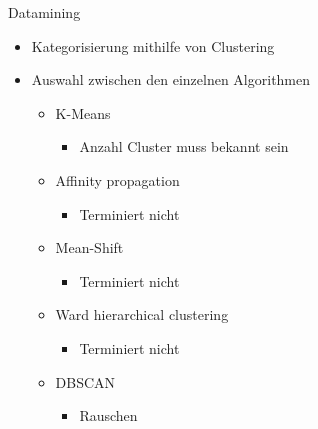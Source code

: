 \documentclass[compress,t]{beamer}
\begin{document}
\begin{frame}{Datamining}

    \begin{itemize}
        \item Kategorisierung mithilfe von Clustering
        \item Auswahl zwischen den einzelnen Algorithmen
            \begin{itemize}
                \item K-Means
                    \begin{itemize}
                        \item Anzahl Cluster muss bekannt sein
                    \end{itemize}
                \item Affinity propagation
                    \begin{itemize}
                        \item Terminiert nicht
                    \end{itemize}
                \item Mean-Shift
                    \begin{itemize}
                        \item Terminiert nicht
                    \end{itemize}
                \item Ward hierarchical clustering
                    \begin{itemize}
                        \item Terminiert nicht
                    \end{itemize}
                \item DBSCAN
                    \begin{itemize}
                        \item Rauschen
                    \end{itemize}
            \end{itemize}
    \end{itemize}

\end{frame}
\end{document}
